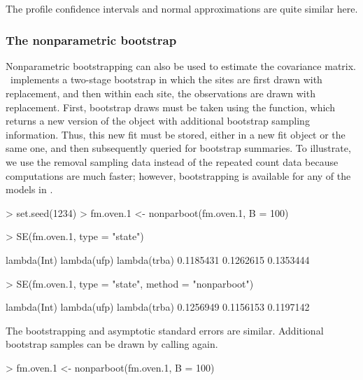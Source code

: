 \documentclass[article,shortnames]{jss}
\newcommand{\um}{\pkg{unmarked}}
\begin{document}
{The profile confidence intervals and normal approximations are quite
similar here.

\subsubsection{The nonparametric bootstrap}

Nonparametric bootstrapping can also be used to estimate the
covariance matrix. \um\ implements a two-stage bootstrap in which the
 sites are first drawn with replacement, and then within each site, the
observations are drawn with replacement.  First, bootstrap draws must
be taken using the  function, which returns a new
version of the  object with additional bootstrap sampling
information.  Thus, this new fit must be stored, either in a new fit
object or the same one, and then subsequently queried for bootstrap
summaries.  To illustrate, we use the removal sampling data instead of the
repeated count data because computations are much faster; however, 
bootstrapping is available for any of the models in \um.

\begin{Schunk}
\begin{Sinput}
> set.seed(1234)
> fm.oven.1 <- nonparboot(fm.oven.1, B = 100)
\end{Sinput}
\end{Schunk}

\begin{Schunk}
\begin{Sinput}
> SE(fm.oven.1, type = "state")
\end{Sinput}
\begin{Soutput}
 lambda(Int)  lambda(ufp) lambda(trba) 
   0.1185431    0.1262615    0.1353444 
\end{Soutput}
\begin{Sinput}
> SE(fm.oven.1, type = "state", method = "nonparboot")
\end{Sinput}
\begin{Soutput}
 lambda(Int)  lambda(ufp) lambda(trba) 
   0.1256949    0.1156153    0.1197142 
\end{Soutput}
\end{Schunk}

The bootstrapping and asymptotic standard errors are similar. Additional 
bootstrap samples can be drawn by calling  again.

\begin{Schunk}
\begin{Sinput}
> fm.oven.1 <- nonparboot(fm.oven.1, B = 100)
\end{Sinput}
\end{Schunk}



}
\end{document}
